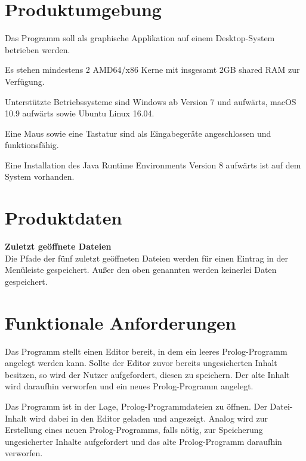 \documentclass[parskip=full,11pt,twoside]{scrartcl}
\begin{document}
\section{Produktumgebung}

Das Programm soll als graphische Applikation auf einem Desktop-System betrieben werden.

Es stehen mindestens 2 AMD64/x86 Kerne mit insgesamt 2GB shared RAM zur Verfügung.

Unterstützte Betriebssysteme sind Windows ab Version 7 und aufwärts, macOS 10.9 aufwärts sowie Ubuntu Linux 16.04.

Eine Maus sowie eine Tastatur sind als Eingabegeräte angeschlossen und funktionsfähig.

Eine Installation des Java Runtime Environments Version 8 aufwärts ist auf dem System vorhanden.

\section{Produktdaten}

\textbf{Zuletzt geöffnete Dateien} \\
Die Pfade der fünf zuletzt geöffneten Dateien werden für einen Eintrag in der Menüleiste gespeichert. Außer den oben genannten werden keinerlei Daten gespeichert.
\section{Funktionale Anforderungen}


Das Programm stellt einen Editor bereit, in dem ein leeres Prolog-Programm angelegt werden kann. Sollte der Editor zuvor bereits ungesicherten Inhalt besitzen, so wird der Nutzer aufgefordert, diesen zu speichern. Der alte Inhalt wird daraufhin verworfen und ein neues Prolog-Programm angelegt.


Das Programm ist in der Lage, Prolog-Programmdateien zu öffnen. Der Datei-Inhalt wird dabei in den Editor geladen und angezeigt. Analog wird zur Erstellung eines neuen Prolog-Programms, falls nötig, zur Speicherung ungesicherter Inhalte aufgefordert und das alte Prolog-Programm daraufhin verworfen.

\end{document}
